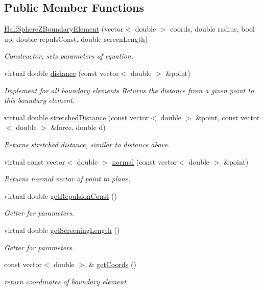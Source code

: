 \subsection*{Public Member Functions}
\begin{DoxyCompactItemize}
\item 
\hyperlink{classHalfSphereZBoundaryElement_a5a8a08144d00155c08d700783215c788}{Half\+Sphere\+Z\+Boundary\+Element} (vector$<$ double $>$ coords, double radius, bool up, double repuls\+Const, double screen\+Length)
\begin{DoxyCompactList}\small\item\em Constructor, sets parameters of equation. \end{DoxyCompactList}\item 
virtual double \hyperlink{classHalfSphereZBoundaryElement_ad954352392ba721b772cf9a0177edec1}{distance} (const vector$<$ double $>$ \&point)
\begin{DoxyCompactList}\small\item\em Implement for all boundary elements Returns the distance from a given point to this boundary element. \end{DoxyCompactList}\item 
virtual double \hyperlink{classHalfSphereZBoundaryElement_a836d5117066fbfab38903475e5fc0d8d}{stretched\+Distance} (const vector$<$ double $>$ \&point, const vector$<$ double $>$ \&force, double d)
\begin{DoxyCompactList}\small\item\em Returns stretched distance, similar to distance above. \end{DoxyCompactList}\item 
virtual const vector$<$ double $>$ \hyperlink{classHalfSphereZBoundaryElement_a3d1287ac0239294c1dbfdd2c799dcd7f}{normal} (const vector$<$ double $>$ \&point)
\begin{DoxyCompactList}\small\item\em Returns normal vector of point to plane. \end{DoxyCompactList}\item 
virtual double \hyperlink{classHalfSphereZBoundaryElement_a672b90ff798b849ef705384ab9f745bc}{get\+Repulsion\+Const} ()
\begin{DoxyCompactList}\small\item\em Getter for parameters. \end{DoxyCompactList}\item 
virtual double \hyperlink{classHalfSphereZBoundaryElement_ab7b9034066dbc5bec386a04f6bc3a91f}{get\+Screening\+Length} ()
\begin{DoxyCompactList}\small\item\em Getter for parameters. \end{DoxyCompactList}\item 
const vector$<$ double $>$ \& \hyperlink{classBoundaryElement_ace76817d750bb44c11edd918f1a8b78f}{get\+Coords} ()
\begin{DoxyCompactList}\small\item\em return coordinates of boundary element \end{DoxyCompactList}\end{DoxyCompactItemize}
